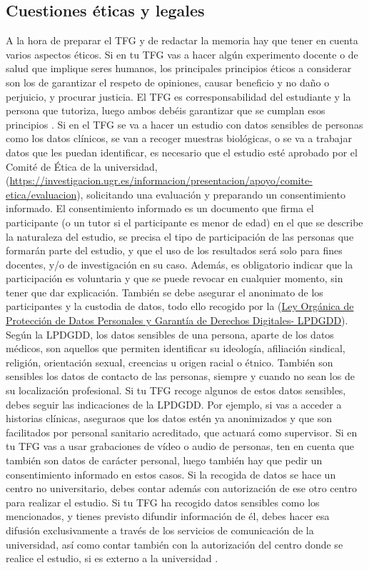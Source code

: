 {%
\subsection{Cuestiones éticas y legales}%

A la hora de preparar el TFG y de redactar la memoria hay que tener en cuenta varios aspectos éticos.
Si en tu TFG vas a hacer algún experimento docente o de salud que implique seres humanos, los principales principios éticos a considerar son los de garantizar el respeto de opiniones, causar beneficio y no daño o perjuicio, y procurar justicia. El TFG es corresponsabilidad del estudiante y la persona que tutoriza, luego ambos debéis garantizar que se cumplan esos principios \cite{EticaCantabria}. 
Si en el TFG se va a hacer un estudio con datos sensibles de personas como los datos clínicos, se van a recoger muestras biológicas, o se va a trabajar datos que les puedan identificar, es necesario que el estudio esté aprobado por el Comité de Ética de la universidad, (\url{https://investigacion.ugr.es/informacion/presentacion/apoyo/comite-etica/evaluacion}), solicitando una evaluación y preparando un consentimiento informado. El consentimiento informado es un documento que firma el participante (o un tutor si el participante es menor de edad) en el que se describe la naturaleza del estudio, se precisa el tipo de participación de las personas que formarán parte del estudio, y que el uso de los resultados será solo para fines docentes, y/o de investigación en su caso. Además, es obligatorio indicar que la participación es voluntaria y que se puede revocar en cualquier momento, sin tener que dar explicación. También se debe asegurar el anonimato de los participantes y la custodia de datos, todo ello recogido por la (\href{https://www.boe.es/buscar/act.php?id=BOE-A-2018-16673}{Ley Orgánica de Protección de Datos Personales y Garantía de Derechos Digitales- LPDGDD}). 
Según la LPDGDD, los datos sensibles de una persona, aparte de los datos médicos, son aquellos que permiten identificar su ideología, afiliación sindical, religión, orientación sexual, creencias u origen racial o étnico. También son sensibles los datos de contacto de las personas, siempre y cuando no sean los de su localización profesional. Si tu TFG recoge algunos de estos datos sensibles, debes seguir las indicaciones de la LPDGDD. Por ejemplo, si vas a acceder a historias clínicas, aseguraos que los datos estén ya anonimizados y que son facilitados por personal sanitario acreditado, que actuará como supervisor. Si en tu TFG vas a usar grabaciones de vídeo o audio de personas, ten en cuenta que también son datos de carácter personal, luego también hay que pedir un consentimiento informado en estos casos. Si la recogida de datos se hace un centro no universitario, debes contar además con autorización de ese otro centro para realizar el estudio.
Si tu TFG ha recogido datos sensibles como los mencionados, y tienes previsto difundir información de él, debes hacer esa difusión exclusivamente a través de los servicios de comunicación de la universidad, así como contar también con la autorización del centro donde se realice el estudio, si es externo a la universidad \cite{EticaUGR}.

}

